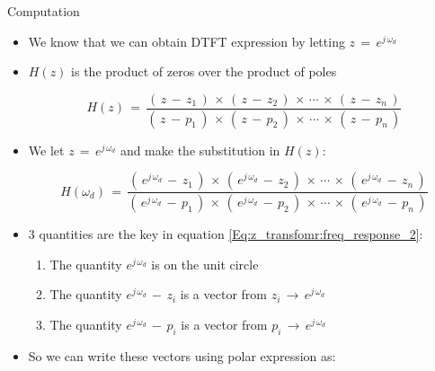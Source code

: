 \begin{frame}[t,allowframebreaks]{Computation}

\begin{itemize}

\item We know that we can obtain DTFT expression by letting $z \, = \, e^{j \, \omega_d}$

\item $H(z)$ is the product of zeros over the product of poles

\begin{equation}
H(z) \, = \, \displaystyle\frac{( \, z \, - \, z_1 \,) \, \times \, ( \, z \, - \, z_2 \,) \, \times \, \cdots \, \times \, ( \, z \, - \, z_n \,)}{( \, z \, - \, p_1 \,) \, \times \,( \, z \, - \, p_2 \,) \, \times \, \cdots \, \times \,( \, z \, - \, p_n \,)}
\end{equation} 

\item We let $z \, = \,  e^{j \, \omega_d}$ and make the substitution in $H(z)$:

\begin{equation}
H(\omega_d) \, = \, \displaystyle\frac{( \,  e^{j \, \omega_d} \, - \, z_1 \,) \, \times \, ( \,  e^{j \, \omega_d} \, - \, z_2 \,) \, \times \, \cdots \, \times \, ( \,  e^{j \, \omega_d} \, - \, z_n \,)}{( \,  e^{j \, \omega_d} \, - \, p_1 \,) \, \times \,( \,  e^{j \, \omega_d} \, - \, p_2 \,) \, \times \, \cdots \, \times \,( \,  e^{j \, \omega_d} \, - \, p_n \,)}
\label{Eq:z_transfomr:freq_response_2}
\end{equation} 

\newpage

\item 3 quantities are the key in equation \autoref{Eq:z_transfomr:freq_response_2}:

	\begin{enumerate}
	\item The quantity $e^{j \, \omega_d}$ is on the unit circle
	
	\item The quantity $ e^{j \, \omega_d} \, - \, z_i$ is a vector from $z_i \, \rightarrow \, e^{j \, \omega_d}$
	
	
	\item The quantity $ e^{j \, \omega_d} \, - \, p_i$ is a vector from $p_i \, \rightarrow \, e^{j \, \omega_d}$
	\end{enumerate}


\item So we can write these vectors using polar expression as:


\end{itemize}
\end{frame}
